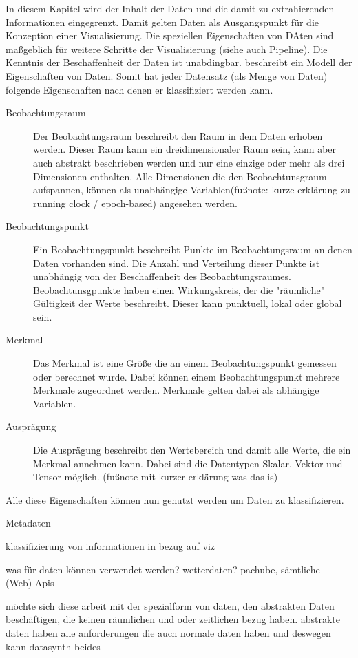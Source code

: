 \documentclass[a4paper, 12pt, onepage, pdftex, headsepline, footsepline]{scrreprt}
\begin{document}
In diesem Kapitel wird der Inhalt der Daten und die damit zu extrahierenden Informationen eingegrenzt.
Damit gelten Daten als Ausgangspunkt für die Konzeption einer Visualisierung. Die speziellen
Eigenschaften von DAten sind maßgeblich für weitere Schritte der Visualisierung (siehe auch Pipeline).
Die Kenntnis der Beschaffenheit der Daten ist unabdingbar.
\cite{Schumann} beschreibt ein Modell der Eigenschaften von Daten. Somit hat jeder Datensatz (als Menge von
Daten) folgende Eigenschaften nach denen er klassifiziert werden kann.
\begin{description}
\item[Beobachtungsraum]
Der Beobachtungsraum beschreibt den Raum in dem Daten erhoben werden. Dieser Raum kann ein
dreidimensionaler Raum sein, kann aber auch abstrakt beschrieben werden und nur eine einzige oder
mehr als drei Dimensionen enthalten. Alle Dimensionen die den Beobachtunsgraum aufspannen,
können als unabhängige Variablen(fußnote: kurze erklärung zu running clock / epoch-based) angesehen werden.
\item[Beobachtungspunkt]
Ein Beobachtungspunkt beschreibt Punkte im Beobachtungsraum an denen Daten vorhanden sind. Die Anzahl und Verteilung
dieser Punkte ist unabhängig von der Beschaffenheit des Beobachtungsraumes. Beobachtunsgpunkte haben einen
Wirkungskreis, der die "räumliche" Gültigkeit der Werte beschreibt. Dieser kann punktuell, lokal oder global sein.
\item[Merkmal]
Das Merkmal ist eine Größe die an einem Beobachtungspunkt gemessen oder berechnet wurde. Dabei können
einem Beobachtungspunkt mehrere Merkmale zugeordnet werden. Merkmale gelten dabei als abhängige Variablen.
\item[Ausprägung]
Die Ausprägung beschreibt den Wertebereich und damit alle Werte, die ein Merkmal annehmen kann.
Dabei sind die Datentypen Skalar, Vektor und Tensor möglich. (fußnote mit kurzer erklärung was das is)
\end{description}
Alle diese Eigenschaften können nun genutzt werden um Daten zu klassifizieren.


Metadaten

klassifizierung von informationen in bezug auf viz

was für daten können verwendet werden? wetterdaten? pachube, sämtliche (Web)-Apis

möchte sich diese arbeit mit der spezialform von daten, den abstrakten Daten beschäftigen, die keinen räumlichen
und oder zeitlichen bezug haben.
abstrakte daten haben alle anforderungen die auch normale daten haben und deswegen kann datasynth beides
\end{document}
